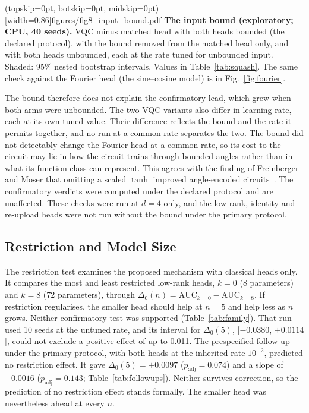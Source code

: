 \documentclass{ieeeaccess}
\newcommand{\vqc}{VQC}
\begin{document}
\Figure[t!](topskip=0pt, botskip=0pt, midskip=0pt)[width=0.86\columnwidth]{figures/fig8_input_bound.pdf}
{\textbf{The input bound (exploratory; CPU, 40 seeds).} \vqc{} minus matched head with both heads bounded (the declared protocol), with the bound removed from the matched head only, and with both heads unbounded, each at the rate tuned for unbounded input. Shaded: 95\% nested bootstrap intervals. Values in Table~\ref{tab:squash}. The same check against the Fourier head (the sine--cosine model) is in Fig.~\ref{fig:fourier}.\label{fig:squash}}

The bound therefore does not explain the confirmatory lead, which grew when both arms were unbounded. The two \vqc{} variants also differ in learning rate, each at its own tuned value. Their difference reflects the bound and the rate it permits together, and no run at a common rate separates the two. The bound did not detectably change the Fourier head at a common rate, so its cost to the circuit may lie in how the circuit trains through bounded angles rather than in what its function class can represent. This agrees with the finding of Freinberger and Moser that omitting a scaled $\tanh$ improved angle-encoded circuits~\cite{freinberger2026}. The confirmatory verdicts were computed under the declared protocol and are unaffected. These checks were run at $d=4$ only, and the low-rank, identity and re-upload heads were not run without the bound under the primary protocol.

\subsection{Restriction and Model Size}
\label{sec:restriction}
The restriction test examines the proposed mechanism with classical heads only. It compares the most and least restricted low-rank heads, $k=0$ (8 parameters) and $k=8$ (72 parameters), through $\Delta_0(n)=\mathrm{AUC}_{k=0}-\mathrm{AUC}_{k=8}$. If restriction regularises, the smaller head should help at $n=5$ and help less as $n$ grows. Neither confirmatory test was supported (Table~\ref{tab:family}). That run used 10 seeds at the untuned rate, and its interval for $\Delta_0(5)$, [$-0.0380$, $+0.0114$], could not exclude a positive effect of up to 0.011. The prespecified follow-up under the primary protocol, with both heads at the inherited rate $10^{-2}$, predicted no restriction effect. It gave $\Delta_0(5)=+0.0097$ ($p_{\mathrm{adj}}=0.074$) and a slope of $-0.0016$ ($p_{\mathrm{adj}}=0.143$; Table~\ref{tab:followups}). Neither survives correction, so the prediction of no restriction effect stands formally. The smaller head was nevertheless ahead at every $n$.
\end{document}
